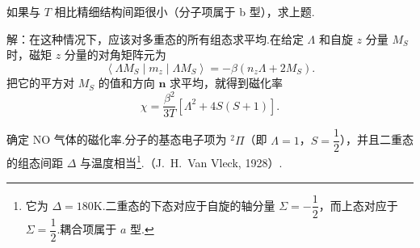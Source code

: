 \begin{xiti}
\quad 如果与 $T$ 相比精细结构间距很小（分子项属于 b 型），求上题.

解：在这种情况下，应该对多重态的所有组态求平均.在给定 $\Lambda$ 和自旋 $z$ 分量 $M_S$ 时，磁矩 $z$ 分量的对角矩阵元为
\begin{equation*}
  \left\langle\Lambda M_S\middle|m_z\middle|\Lambda M_S\right\rangle
  =-\beta\left(n_z\Lambda+2M_S\right).
\end{equation*}
把它的平方对 $M_S$ 的值和方向 $\boldsymbol{n}$ 求平均，就得到磁化率
\begin{equation*}
  \chi=\frac{\beta^2}{3T}\left[\Lambda^2+4S(S+1)\right].
\end{equation*}

\quad 确定 NO 气体的磁化率.分子的基态电子项为 $^2\Pi$（即 $\Lambda=1$，$S=\dfrac{1}{2}$），并且二重态的组态间距 $\Delta$ 与温度相当\footnote{它为 $\Delta=180$K.二重态的下态对应于自旋的轴分量 $\Sigma=-\dfrac{1}{2}$，而上态对应于 $\Sigma=\dfrac{1}{2}$.耦合项属于 $a$ 型.}.（J.~H.~Van Vleck, 1928）.


\end{xiti}
